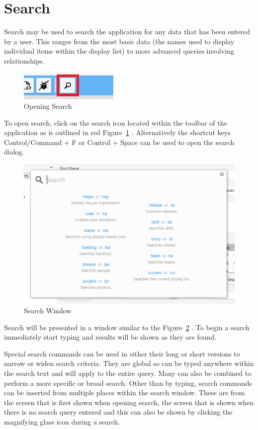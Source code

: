 \section{Search}

Search may be used to search the application for any data that has been entered by a user. This ranges from the most basic data (the names used to display individual items within the display list) to more advanced queries involving relationships.

\begin{figure}[H]
\centering
\includegraphics[]{images/screenshots/search1.PNG}
\caption{Opening Search}
\label{fig:search_icon}
\end{figure}

To open search, click on the search icon located within the toolbar of the application as is outlined in red Figure~\ref{fig:search_icon} . Alternatively the shortcut keys Control/Command + F or Control + Space can be used to open the search dialog.

\begin{figure}[H]
\centering
\includegraphics[width=\textwidth]{images/screenshots/search2.PNG}
\caption{Search Window}
\label{fig:search_window}
\end{figure}

Search will be presented in a window similar to the Figure~\ref{fig:search_window} . To begin a search immediately start typing and results will be shown as they are found.

Special search commands can be used in either their long or short versions to narrow or widen search criteria. They are global so can be typed anywhere within the search text and will apply to the entire query. Many can also be combined to perform a more specific or broad search.\newline
Other than by typing, search commands can be inserted from multiple places within the search window. These are from the screen that is first shown when opening search, the screen that is shown when there is no search query entered and this can also be shown by clicking the magnifying glass icon during a search. 


